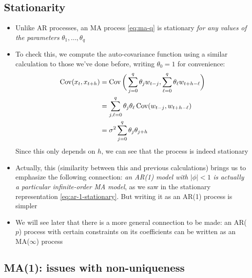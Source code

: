 \documentclass{article}
\begin{document}
\subsection{Stationarity}

\begin{itemize}
\item Unlike AR processes, an MA process \eqref{eq:ma-q} is stationary \emph{for
    any values of the parameters $\theta_1,\dots,\theta_q$}

\item To check this, we compute the auto-covariance function using a similar
  calculation to those we've done before, writing $\theta_0 = 1$ for
  convenience:  
  \begin{align}
  \nonumber
  \operatorname{Cov}(x_t, x_{t+h}) &= \operatorname{Cov}\bigg( \sum_{j=0}^q \theta_j w_{t-j}, 
  \sum_{\ell=0}^q \theta_\ell w_{t+h-\ell} \bigg) \\
  \nonumber
  &= \sum_{j,\ell=0}^q \theta_j \theta_\ell \operatorname{Cov}( w_{t-j}, w_{t+h-\ell} ) \\
  \label{eq:ma-q-auto-cov}
  &= \sigma^2 \sum_{j=0}^q \theta_j \theta_{j+h}
  \end{align}
  Since this only depends on $h$, we can see that the process is indeed
  stationary 

\item Actually, this (similarity between this and previous calculations) brings
  us to emphasize the following connection: \emph{an AR(1) model with $|\phi| <
    1$ is actually a particular infinite-order MA model}, as we saw in the
  stationary representation \eqref{eq:ar-1-stationary}. But writing it as an
  AR(1) process is simpler   

\item We will see later that there is a more general connection to be made: an  
  AR($p$) process with certain constraints on its coefficients can be written as
  an MA($\infty$) process
\end{itemize}

\subsection{MA(1): issues with non-uniqueness}
\end{document}
